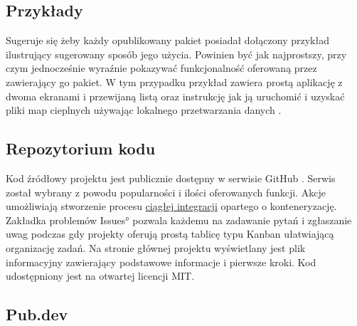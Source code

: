 \subsection{Przykłady}
Sugeruje się żeby każdy opublikowany pakiet posiadał dołączony przykład ilustrujący sugerowany sposób jego użycia. Powinien być jak najprostszy, przy czym jednocześnie wyraźnie pokazywać funkcjonalność oferowaną przez zawierający go pakiet. W tym przypadku przykład zawiera prostą aplikację z dwoma ekranami i przewijaną listą oraz instrukcję jak ją uruchomić i uzyskać pliki map cieplnych używając lokalnego przetwarzania danych \cite{RS_Example}.

\subsection{Repozytorium kodu}
Kod źródłowy projektu jest publicznie dostępny w serwisie GitHub \cite{RoundSpot_GitHub}. Serwis został wybrany z powodu popularności i ilości oferowanych funkcji. Akcje umożliwiają stworzenie procesu \hyperref[sec:rs_ci]{ciągłej integracji} opartego o konteneryzację. Zakładka problemów \ang{Issues} pozwala każdemu na zadawanie pytań i zgłaszanie uwag podczas gdy projekty oferują prostą tablicę typu Kanban ułatwiającą organizację zadań. Na stronie głównej projektu wyświetlany jest plik informacyjny  zawierający podstawowe informacje i pierwsze kroki. Kod udostępniony jest na otwartej licencji MIT.

\subsection{Pub.dev}
